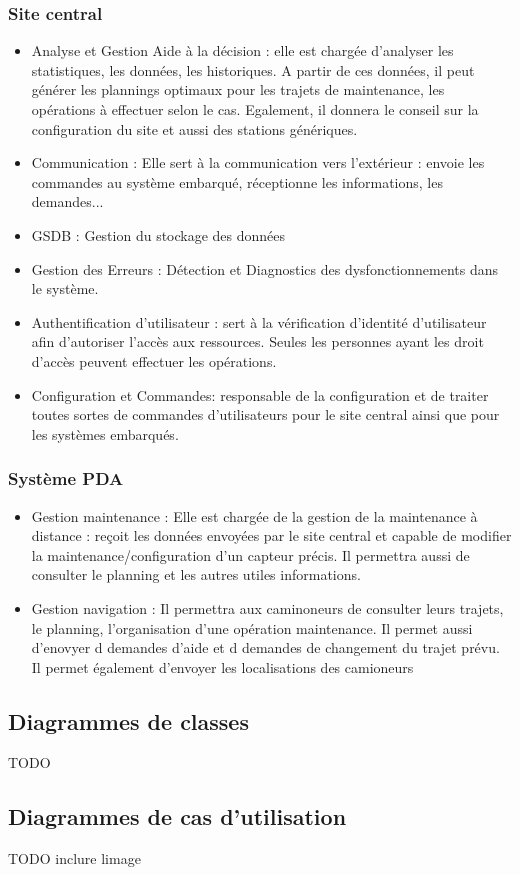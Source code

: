 \subsubsection{Site central}

	\begin{itemize}
	    \item Analyse et Gestion Aide à la décision : elle est chargée d’analyser les statistiques, les données, les historiques. A partir de ces données, il peut générer les plannings optimaux pour les trajets de maintenance, les opérations à effectuer selon le cas. Egalement, il donnera le conseil sur la configuration du site et aussi des stations génériques.
 
	    \item Communication : Elle sert à la communication vers l’extérieur : envoie les commandes au système embarqué, réceptionne les informations, les demandes... 
	    \item GSDB : Gestion du stockage des données
	    \item Gestion des Erreurs : Détection et Diagnostics des dysfonctionnements dans le système.
	    \item Authentification d’utilisateur : sert à la vérification d’identité d’utilisateur afin d’autoriser l’accès aux ressources. Seules les personnes ayant les droit d’accès peuvent effectuer les opérations.
		\item Configuration et Commandes: responsable de la configuration et de traiter toutes sortes de commandes d’utilisateurs pour le site central ainsi que pour les systèmes embarqués. 

	\end{itemize}

\subsubsection{Système PDA}
	\begin{itemize}
	\item Gestion maintenance : Elle est chargée de la gestion de la maintenance à distance : reçoit les données envoyées par le site central et capable de modifier la maintenance/configuration d'un capteur précis. Il permettra aussi
de consulter le planning et les autres utiles informations.

	\item Gestion navigation : Il permettra aux caminoneurs de consulter leurs trajets, le planning, l'organisation d'une opération maintenance. Il permet aussi d'enovyer d demandes d'aide et d demandes de changement du trajet prévu. Il permet également d'envoyer les localisations des camioneurs

	\end{itemize}
	
	
\subsection{Diagrammes de classes}	
TODO 	
\subsection{Diagrammes de cas d'utilisation}	
TODO inclure limage


